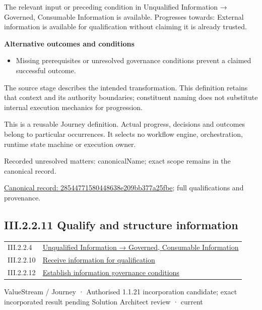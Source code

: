 The relevant input or preceding condition in Unqualified Information → Governed, Consumable Information is available. Progresses towards: External information is available for qualification without claiming it is already trusted.



\par\medskip\textbf{Alternative outcomes and conditions}\par


\begin{itemize}


\item Missing prerequisites or unresolved governance conditions prevent a claimed successful outcome.

\end{itemize}


The source stage describes the intended transformation. This definition retains that context and its authority boundaries; constituent naming does not substitute internal execution mechanics for progression.



This is a reusable Journey definition. Actual progress, decisions and outcomes belong to particular occurrences. It selects no workflow engine, orchestration, runtime state machine or execution owner.


{\small Recorded unresolved matters: canonicalName; exact scope remains in the canonical record.}\par
{\footnotesize \href{../../../../continuum/strategy/value-stream/28544771580448638e209bb377a25fbe.md}{Canonical record: 28544771580448638e209bb377a25fbe}; full qualifications and provenance.}\par
\subsection*{III.2.2.11 Qualify and structure information}
\label{navigation:III.2.2.11}

\begin{longtable}{p{.22\linewidth}p{.73\linewidth}}
III.2.2.4 & \hyperref[element:02e036f18bab400bac261007e39457ee]{Unqualified Information → Governed, Consumable Information} \\
III.2.2.10 & \hyperref[element:28544771580448638e209bb377a25fbe]{Receive information for qualification} \\
III.2.2.12 & \hyperref[element:ae90f7118fe245659f4524fc8991614d]{Establish information governance conditions} \\
\end{longtable}
\label{element:cbedc98406674727a9b1eae8d9bc30da}
{\small ValueStream / Journey · Authorised 1.1.21 incorporation candidate; exact incorporated result pending Solution Architect review · current}\par


